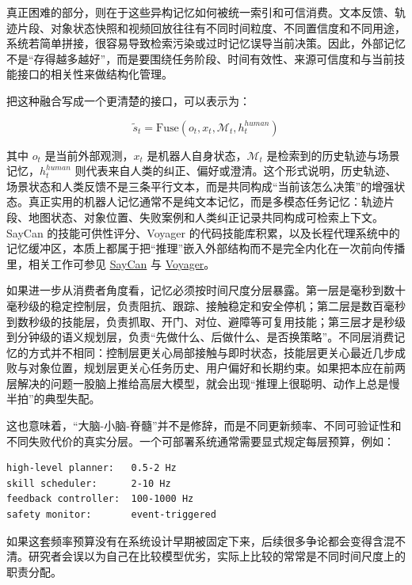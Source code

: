 真正困难的部分，则在于这些异构记忆如何被统一索引和可信消费。文本反馈、轨迹片段、对象状态快照和视频回放往往有不同时间粒度、不同置信度和不同用途，系统若简单拼接，很容易导致检索污染或过时记忆误导当前决策。因此，外部记忆不是“存得越多越好”，而是要围绕任务阶段、时间有效性、来源可信度和与当前技能接口的相关性来做结构化管理。

把这种融合写成一个更清楚的接口，可以表示为：

\begingroup
\footnotesize
\begin{equation*}
\tilde{s}_t = \mathrm{Fuse}(o_t, x_t, \mathcal{M}_t, h_t^{human})
\end{equation*}
\endgroup

其中 \(o_t\) 是当前外部观测，\(x_t\) 是机器人自身状态，\(\mathcal{M}_t\) 是检索到的历史轨迹与场景记忆，\(h_t^{human}\) 则代表来自人类的纠正、偏好或澄清。这个形式说明，历史轨迹、场景状态和人类反馈不是三条平行文本，而是共同构成“当前该怎么决策”的增强状态。真正实用的机器人记忆通常不是纯文本记忆，而是多模态任务记忆：轨迹片段、地图状态、对象位置、失败案例和人类纠正记录共同构成可检索上下文。SayCan 的技能可供性评分、Voyager 的代码技能库积累，以及长程代理系统中的记忆缓冲区，本质上都属于把“推理”嵌入外部结构而不是完全内化在一次前向传播里，相关工作可参见 \href{https://arxiv.org/abs/2204.01691}{SayCan} 与 \href{https://arxiv.org/abs/2305.16291}{Voyager}。

如果进一步从消费者角度看，记忆必须按时间尺度分层暴露。第一层是毫秒到数十毫秒级的稳定控制层，负责阻抗、跟踪、接触稳定和安全停机；第二层是数百毫秒到数秒级的技能层，负责抓取、开门、对位、避障等可复用技能；第三层才是秒级到分钟级的语义规划层，负责“先做什么、后做什么、是否换策略”。不同层消费记忆的方式并不相同：控制层更关心局部接触与即时状态，技能层更关心最近几步成败与对象位置，规划层更关心任务历史、用户偏好和长期约束。如果把本应在前两层解决的问题一股脑上推给高层大模型，就会出现“推理上很聪明、动作上总是慢半拍”的典型失配。

这也意味着，“大脑-小脑-脊髓”并不是修辞，而是不同更新频率、不同可验证性和不同失败代价的真实分层。一个可部署系统通常需要显式规定每层预算，例如：

\begin{lstlisting}
high-level planner:   0.5-2 Hz
skill scheduler:      2-10 Hz
feedback controller:  100-1000 Hz
safety monitor:       event-triggered
\end{lstlisting}

如果这套频率预算没有在系统设计早期被固定下来，后续很多争论都会变得含混不清。研究者会误以为自己在比较模型优劣，实际上比较的常常是不同时间尺度上的职责分配。

